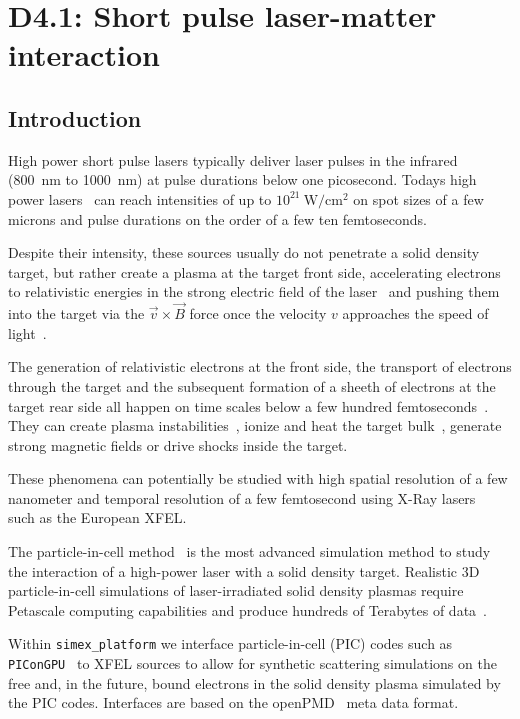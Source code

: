 \documentclass[a4paper]{article}
\begin{document}
\section{D4.1: Short pulse laser-matter interaction\label{sec:short_pulse}}
%
\subsection{Introduction}
High power short pulse lasers typically deliver laser pulses in the infrared (800~nm to 1000~nm) at pulse durations below one
picosecond. Todays high power lasers~\cite{Siebold2008} can reach intensities of up to $10^{21}~\text{W}/\text{cm}^2$ on spot
sizes of a few microns and pulse durations on the order of a few ten femtoseconds.

Despite their intensity, these sources usually do not penetrate a solid density target, but rather create a plasma at the target front side, accelerating electrons to relativistic energies in the strong electric field of the laser~\cite{Kluge2011} and pushing them into the target via the $\vec{v}\times\vec{B}$ force once the velocity $v$ approaches the speed of light~\cite{Mulser2010,Gibbon1996}.

The generation of relativistic electrons at the front side, the transport of electrons through the target and the subsequent formation of a sheeth of electrons at the target rear side all happen on time scales below a few hundred femtoseconds~\cite{Macchi2013}. They can create plasma instabilities~\cite{Metzkes2014}, ionize and heat the target bulk~\cite{Huang2013}, generate strong magnetic fields or drive shocks inside the target.

These phenomena can potentially be studied with high spatial resolution of a few nanometer and temporal resolution of a few femtosecond using X-Ray lasers~\cite{Kluge2014,Kluge2016} such as the European XFEL.

The particle-in-cell method~\cite{Birdsall2004} is the most advanced simulation method to study the interaction of a high-power laser with a solid density target. Realistic 3D particle-in-cell simulations of laser-irradiated solid density plasmas require Petascale computing capabilities and produce hundreds of Terabytes of data~\cite{ornl_picongpu}.

Within \texttt{simex\_platform} we interface particle-in-cell (PIC) codes such as \texttt{PIConGPU}~\cite{Bussmann2013, picongpu_github} to XFEL sources to allow for synthetic scattering simulations on the free and, in the future, bound electrons in the solid density plasma simulated by the PIC codes. Interfaces are based on the openPMD~\cite{openPMD} meta data format.
\end{document}
